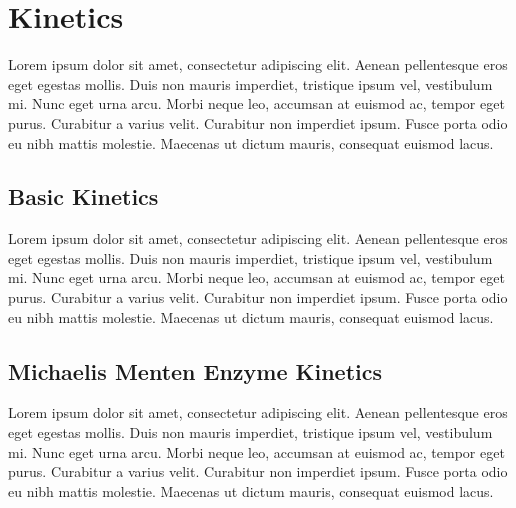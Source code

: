 \documentclass[12pt]{article}
\begin{document}
\section{Kinetics}
Lorem ipsum dolor sit amet, consectetur adipiscing elit. Aenean pellentesque eros eget egestas mollis. Duis non mauris imperdiet, tristique ipsum vel, vestibulum mi. Nunc eget urna arcu. Morbi neque leo, accumsan at euismod ac, tempor eget purus. Curabitur a varius velit. Curabitur non imperdiet ipsum. Fusce porta odio eu nibh mattis molestie. Maecenas ut dictum mauris, consequat euismod lacus.

\subsection{Basic Kinetics}
Lorem ipsum dolor sit amet, consectetur adipiscing elit. Aenean pellentesque eros eget egestas mollis. Duis non mauris imperdiet, tristique ipsum vel, vestibulum mi. Nunc eget urna arcu. Morbi neque leo, accumsan at euismod ac, tempor eget purus. Curabitur a varius velit. Curabitur non imperdiet ipsum. Fusce porta odio eu nibh mattis molestie. Maecenas ut dictum mauris, consequat euismod lacus.

\subsection{Michaelis Menten Enzyme Kinetics}
Lorem ipsum dolor sit amet, consectetur adipiscing elit. Aenean pellentesque eros eget egestas mollis. Duis non mauris imperdiet, tristique ipsum vel, vestibulum mi. Nunc eget urna arcu. Morbi neque leo, accumsan at euismod ac, tempor eget purus. Curabitur a varius velit. Curabitur non imperdiet ipsum. Fusce porta odio eu nibh mattis molestie. Maecenas ut dictum mauris, consequat euismod lacus.

\nocite{*}

\newpage

\printbibliography
\end{document}
